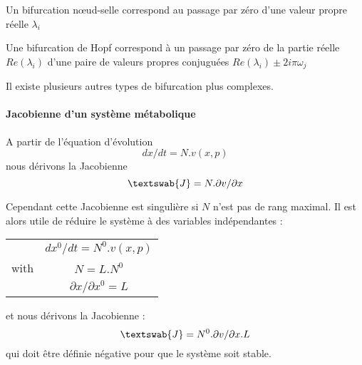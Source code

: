 Un bifurcation nœud-selle correspond au passage par zéro d'une valeur propre réelle $\lambda_i$

Une bifurcation de Hopf correspond à un passage par zéro de la partie réelle $Re(\lambda_i)$ d'une paire de valeurs propres conjuguées $ Re(\lambda_i) \pm 2i\pi\omega_j $

Il existe plusieurs autres types de bifurcation plus complexes.



\paragraph{Jacobienne d'un système métabolique}
A partir de l'équation d'évolution 
$$dx/dt = N . v(x,p) $$
nous dérivons la Jacobienne 
$$ \textswab{J} = N. \partial v / \partial x $$


Cependant cette Jacobienne est singulière si $N$ n'est pas de rang maximal. Il est alors utile de réduire le système à des variables indépendantes :
\begin{tabular}{lc}
			&	$dx^0/dt = N^0 . v(x,p)$ \\
	with	&	$N=L.N^0$	\\
			&	$\partial x / \partial x^0=L $
\end{tabular}
et nous dérivons la Jacobienne :
$$ \textswab{J}=N^0 . \partial v / \partial x . L $$
qui doit être définie négative pour que le système soit stable.

